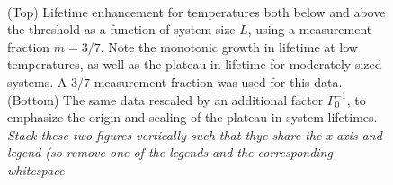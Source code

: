 \documentclass[twocolumn,superscriptaddress,aps,prb,floatfix]{revtex4-1}
\newcommand{\CMH}[1]{{\color{green} { #1}}}
\begin{document}
\begin{figure}
\begin{center}
\\
\vspace{-1.2\baselineskip}
\end{center}
\caption[justification=raggedright]{
(Top) Lifetime enhancement for temperatures both below and above the threshold as a function of system size $L$, using a measurement fraction $m=3/7$.  Note the monotonic growth in lifetime at low temperatures, as well as the plateau in lifetime for moderately sized systems. A $3/7$ measurement fraction was used for this data.
(Bottom) The same data rescaled by an additional factor $\Gamma_0^{-1}$, to emphasize the origin and scaling of the plateau in system lifetimes. \CMH{\it{Stack these two figures vertically such that thye share the x-axis and legend (so remove one of the legends and the corresponding whitespace}}}
\label{fig:LifetimeVsSystemSize}
\end{figure}
\end{document}
